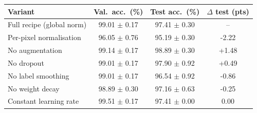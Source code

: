 \begin{tabular}{lccc}
\toprule
Variant & Val.\ acc.\ (\%) & Test acc.\ (\%) & $\Delta$ test (pts)\\
\midrule
Full recipe (global norm) & 99.01 $\pm$ 0.17 & 97.41 $\pm$ 0.30 & --\\
Per-pixel normalisation & 96.05 $\pm$ 0.76 & 95.19 $\pm$ 0.30 & -2.22\\
No augmentation & 99.14 $\pm$ 0.17 & 98.89 $\pm$ 0.30 & +1.48\\
No dropout & 99.01 $\pm$ 0.17 & 97.90 $\pm$ 0.92 & +0.49\\
No label smoothing & 99.01 $\pm$ 0.17 & 96.54 $\pm$ 0.92 & -0.86\\
No weight decay & 98.89 $\pm$ 0.30 & 97.16 $\pm$ 0.63 & -0.25\\
Constant learning rate & 99.51 $\pm$ 0.17 & 97.41 $\pm$ 0.00 & 0.00\\
\bottomrule
\end{tabular}
